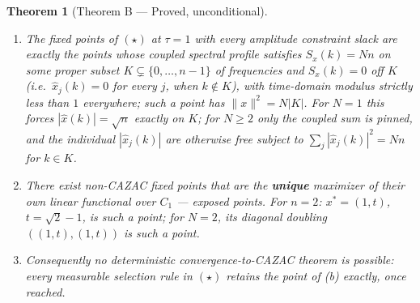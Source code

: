 \documentclass[11pt]{article}
\theoremstyle{plain}
\newtheorem{theorem}{Theorem}[section]
\theoremstyle{definition}
\theoremstyle{remark}
\begin{document}
\begin{theorem}[Theorem B --- Proved, unconditional]\label{thm:B}
\begin{enumerate}
\item[\rm(a)] The fixed points of $(\star)$ at $\tau=1$ with every
amplitude constraint slack are exactly the points whose \emph{coupled}
spectral profile satisfies $S_x(k)=Nn$ on some proper subset
$K\subsetneq\{0,\dots,n-1\}$ of frequencies and $S_x(k)=0$ off $K$ (i.e.\
$\widehat x_j(k)=0$ for every $j$, when $k\notin K$), with time-domain
modulus strictly less than $1$ everywhere; such a point has
$\|x\|^2=N|K|$. For $N=1$ this forces $|\widehat x(k)|=\sqrt n$ exactly on
$K$; for $N\ge2$ only the coupled sum is pinned, and the individual
$|\widehat x_j(k)|$ are otherwise free subject to
$\sum_j|\widehat x_j(k)|^2=Nn$ for $k\in K$.
\item[\rm(b)] There exist non-CAZAC fixed points that are the
\textbf{unique} maximizer of their own linear functional over $C_1$ ---
exposed points. For $n=2$: $x^*=(1,t)$, $t=\sqrt2-1$, is such a point; for
$N=2$, its diagonal doubling $((1,t),(1,t))$ is such a point.
\item[\rm(c)] Consequently no deterministic convergence-to-CAZAC theorem
is possible: every measurable selection rule in $(\star)$ retains the
point of (b) exactly, once reached.
\end{enumerate}
\end{theorem}
\end{document}
